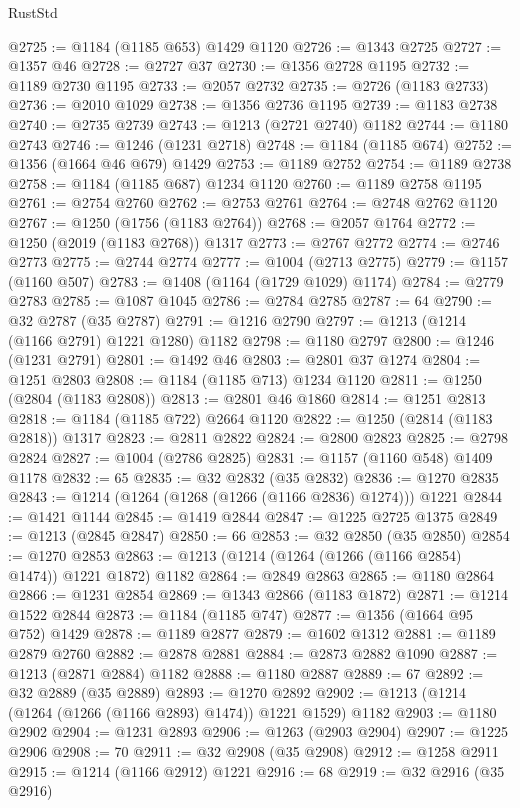 \begin{lexlean}{RustStd}
\begin{coremodule}
@2725 := @1184 (@1185 @653) @1429 @1120
@2726 := @1343 @2725
@2727 := @1357 @46
@2728 := @2727 @37
@2730 := @1356 @2728 @1195
@2732 := @1189 @2730 @1195
@2733 := @2057 @2732
@2735 := @2726 (@1183 @2733)
@2736 := @2010 @1029
@2738 := @1356 @2736 @1195
@2739 := @1183 @2738
@2740 := @2735 @2739
@2743 := @1213 (@2721 @2740) @1182
@2744 := @1180 @2743
@2746 := @1246 (@1231 @2718)
@2748 := @1184 (@1185 @674)
@2752 := @1356 (@1664 @46 @679) @1429
@2753 := @1189 @2752
@2754 := @1189 @2738
@2758 := @1184 (@1185 @687) @1234 @1120
@2760 := @1189 @2758 @1195
@2761 := @2754 @2760
@2762 := @2753 @2761
@2764 := @2748 @2762 @1120
@2767 := @1250 (@1756 (@1183 @2764))
@2768 := @2057 @1764
@2772 := @1250 (@2019 (@1183 @2768)) @1317
@2773 := @2767 @2772
@2774 := @2746 @2773
@2775 := @2744 @2774
@2777 := @1004 (@2713 @2775)
@2779 := @1157 (@1160 @507)
@2783 := @1408 (@1164 (@1729 @1029) @1174)
@2784 := @2779 @2783
@2785 := @1087 @1045
@2786 := @2784 @2785
@2787 := 64
@2790 := @32 @2787 (@35 @2787)
@2791 := @1216 @2790
@2797 := @1213 (@1214 (@1166 @2791) @1221 @1280) @1182
@2798 := @1180 @2797
@2800 := @1246 (@1231 @2791)
@2801 := @1492 @46
@2803 := @2801 @37 @1274
@2804 := @1251 @2803
@2808 := @1184 (@1185 @713) @1234 @1120
@2811 := @1250 (@2804 (@1183 @2808))
@2813 := @2801 @46 @1860
@2814 := @1251 @2813
@2818 := @1184 (@1185 @722) @2664 @1120
@2822 := @1250 (@2814 (@1183 @2818)) @1317
@2823 := @2811 @2822
@2824 := @2800 @2823
@2825 := @2798 @2824
@2827 := @1004 (@2786 @2825)
@2831 := @1157 (@1160 @548) @1409 @1178
@2832 := 65
@2835 := @32 @2832 (@35 @2832)
@2836 := @1270 @2835
@2843 := @1214 (@1264 (@1268 (@1266 (@1166 @2836) @1274))) @1221
@2844 := @1421 @1144
@2845 := @1419 @2844
@2847 := @1225 @2725 @1375
@2849 := @1213 (@2845 @2847)
@2850 := 66
@2853 := @32 @2850 (@35 @2850)
@2854 := @1270 @2853
@2863 := @1213 (@1214 (@1264 (@1266 (@1166 @2854) @1474)) @1221 @1872) @1182
@2864 := @2849 @2863
@2865 := @1180 @2864
@2866 := @1231 @2854
@2869 := @1343 @2866 (@1183 @1872)
@2871 := @1214 @1522 @2844
@2873 := @1184 (@1185 @747)
@2877 := @1356 (@1664 @95 @752) @1429
@2878 := @1189 @2877
@2879 := @1602 @1312
@2881 := @1189 @2879 @2760
@2882 := @2878 @2881
@2884 := @2873 @2882 @1090
@2887 := @1213 (@2871 @2884) @1182
@2888 := @1180 @2887
@2889 := 67
@2892 := @32 @2889 (@35 @2889)
@2893 := @1270 @2892
@2902 := @1213 (@1214 (@1264 (@1266 (@1166 @2893) @1474)) @1221 @1529) @1182
@2903 := @1180 @2902
@2904 := @1231 @2893
@2906 := @1263 (@2903 @2904)
@2907 := @1225 @2906
@2908 := 70
@2911 := @32 @2908 (@35 @2908)
@2912 := @1258 @2911
@2915 := @1214 (@1166 @2912) @1221
@2916 := 68
@2919 := @32 @2916 (@35 @2916)

\end{coremodule}
\end{lexlean}
